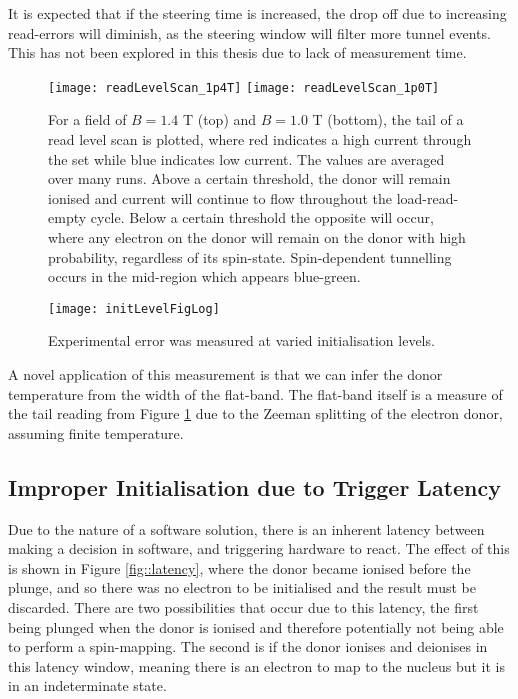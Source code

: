 	It is expected that if the steering time is increased, the drop off due to increasing read-errors will diminish, as the steering window will filter more tunnel events. This has not been explored in this thesis due to lack of measurement time.
	
	\begin{figure}[htbp!]
		\flushleft
		\texttt{[image: readLevelScan\_1p4T]}
		\texttt{[image: readLevelScan\_1p0T]}
		\caption[Read level scan for two magnetic biases]{For a field of $B = 1.4$ T (top) and $B = 1.0$ T (bottom), the tail of a read level scan is plotted, where red indicates a high current through the \gls{set} while blue indicates low current. The values are averaged over many runs. 
		Above a certain threshold, the donor will remain ionised and current will continue to flow throughout the load-read-empty cycle. Below a certain threshold the opposite will occur, where any electron on the donor will remain on the donor with high probability, regardless of its spin-state.
		Spin-dependent tunnelling occurs in the mid-region which appears blue-green. 
		}
		\label{fig::readLevel}
	\end{figure}
	
	\begin{figure}[htbp!]
		\centering
		\texttt{[image: initLevelFigLog]}
		\caption{Experimental error was measured at varied initialisation levels.}
		\label{fig::initLevel}
	\end{figure}
	
	A novel application of this measurement is that we can infer the donor temperature from the width of the flat-band. The flat-band itself is a measure of the tail reading from Figure \ref{fig::readLevel} due to the Zeeman splitting of the electron donor, assuming finite temperature. 

\subsection{Improper Initialisation due to Trigger Latency}
	\label{sec::latency}
	Due to the nature of a software solution, there is an inherent latency between making a decision in software, and triggering hardware to react. The effect of this is shown in Figure \ref{fig::latency}, where the donor became ionised before the plunge, and so there was no electron to be initialised and the result must be discarded. There are two possibilities that occur due to this latency, the first being plunged when the donor is ionised and therefore potentially not being able to perform a spin-mapping. The second is if the donor ionises and deionises in this latency window, meaning there is an electron to map to the nucleus but it is in an indeterminate state.
	
